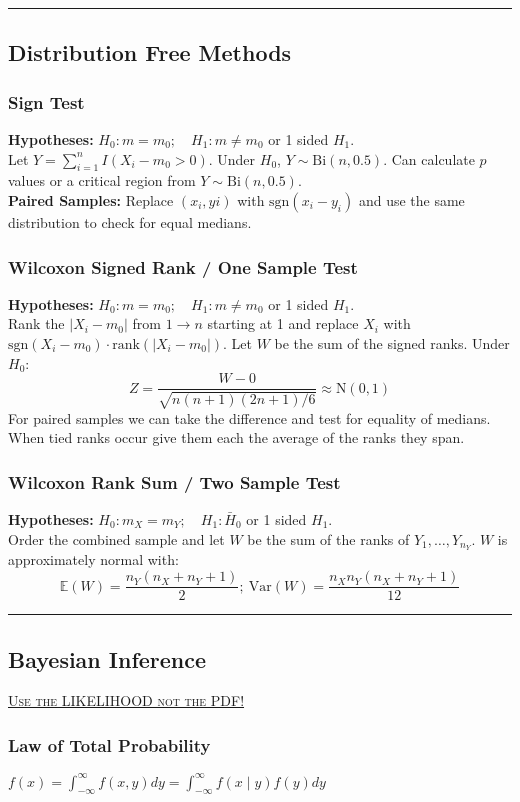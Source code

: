 \documentclass{article}
\begin{document}
\begin{multicols*}{2}
\noindent\rule{\linewidth}{0.25pt}
\subsection*{Distribution Free Methods}
\subsubsection*{Sign Test}
\textbf{Hypotheses:} $H_{0}: m = m_{0}; \quad H_{1}: m \neq m_{0}$ or 1 sided $H_{1}$.\\
Let $Y = \sum_{i=1}^{n} I(X_{i} - m_{0} > 0)$. Under $H_{0}$, $Y \sim \mbox{Bi}(n, 0.5)$. Can calculate $p$ values or a critical region from $Y \sim \mbox{Bi}(n, 0.5)$.\\
\textbf{Paired Samples:} Replace $(x_{i}, y{i})$ with $\mbox{sgn}(x_{i} - y_{i})$ and use the same distribution to check for equal medians. 
\subsubsection*{Wilcoxon Signed Rank / One Sample Test}
\textbf{Hypotheses:} $H_{0}: m = m_{0}; \quad H_{1}: m \neq m_{0}$ or 1 sided $H_{1}$.\\
Rank the $|X_{i} - m_{0}|$ from $1 \to n$ starting at 1 and replace $X_{i}$ with $\mbox{sgn}(X_{i} - m_{0}) \cdot \mbox{rank}(|X_{i} - m_{0}|)$. Let $W$ be the sum of the signed ranks. Under $H_{0}$:
$$Z = \frac{W - 0}{\sqrt{n(n+1)(2n+1) / 6}} \approx \mbox{N}(0, 1)$$
For paired samples we can take the difference and test for equality of medians. When tied ranks occur give them each the average of the ranks they span.
\subsubsection*{Wilcoxon Rank Sum / Two Sample Test}
\textbf{Hypotheses:} $H_{0}: m_{X} = m_{Y}; \quad H_{1}: \bar{H}_{0}$ or 1 sided $H_{1}$.\\
Order the combined sample and let $W$ be the sum of the ranks of $Y_{1}, \dots, Y_{n_{Y}}$. $W$ is approximately normal with:
$$\mathbb{E}(W) = \frac{n_{Y} (n_{X} + n_{Y} + 1)}{2}; \: \mbox{Var}(W) = \frac{n_{X} n_{Y} (n_{X} + n_{Y} + 1)}{12}$$

\noindent\rule{\linewidth}{0.25pt}
\subsection*{Bayesian Inference}
\underline{\color{red} \textsc{Use the LIKELIHOOD not the PDF!}}
\subsubsection*{Law of Total Probability}
$f(x) = \int_{-\infty}^{\infty} f(x, y) dy = \int_{-\infty}^{\infty} f(x \mid y)f(y) dy$

\end{multicols*}
\end{document}
